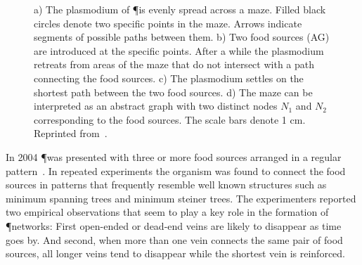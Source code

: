 	\begin{figure}
		\centering
		\newline
		
		\caption[Classic maze experiment with \P]{ a) The plasmodium of 
		\P is evenly spread across a maze. Filled black circles denote two specific points in the maze. Arrows indicate segments of possible paths between them. b) Two food sources (AG) are introduced at the specific points. After a while the plasmodium retreats from areas of the maze that do not intersect with a path connecting the food sources. c) The plasmodium settles on the shortest path between the two food sources. d) The maze can be interpreted as an abstract graph with two distinct nodes $N_1$ and $N_2$ corresponding to the food sources. The scale bars denote 1 cm. Reprinted from~\cite{Tero2007553}.}
		\label{fig:maze}
	\end{figure}

	In 2004 \P was presented with three or more food sources arranged in a regular pattern~\cite{nakagaki2004obtaining}. In repeated experiments the organism was found to connect the food sources in patterns that frequently resemble well known structures such as minimum spanning trees and minimum steiner trees. The experimenters reported two empirical observations that seem to play a key role in the formation of \P networks: First open-ended or dead-end veins are likely to disappear as time goes by. And second, when more than one vein connects the same pair of food sources, all longer veins tend to disappear while the shortest vein is reinforced. 
	
